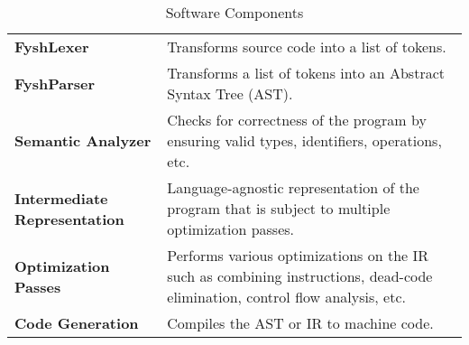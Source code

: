\newcommand{\sw}[2]{%
	\textbf{#1} & #2 \\%
	\hline%
}
\begin{table}[H]
	\begin{tabularx}{\textwidth}{| a | x |}
		\hline
		 &  \\
		\hline
		\sw{FyshLexer}{Transforms source code into a list of tokens.}
		\sw{FyshParser}{Transforms a list of tokens into an Abstract Syntax Tree (AST).}
		\sw{Semantic Analyzer}{%
			Checks for correctness of the program by ensuring valid types,
			identifiers, operations, etc.}
		\sw{Intermediate Representation}{%
			Language-agnostic representation of the program that is subject to
			multiple optimization passes.}
		\sw{Optimization Passes}{%
			Performs various optimizations on the IR such as combining instructions,
			dead-code elimination, control flow analysis, etc.}
		\sw{Code Generation}{Compiles the AST or IR to machine code.}
	\end{tabularx}
	\label{Tab:software}
	\caption{Software Components}
\end{table}

